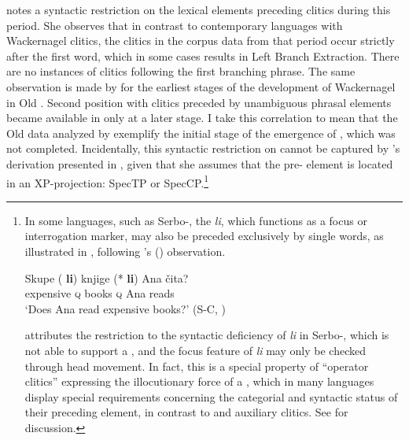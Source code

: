 \documentclass[output=paper,modfonts,newtxmath,hidelinks]{langscibook}
\begin{document}
\citeauthor{pancheva2005} notes a syntactic restriction on the lexical elements preceding  clitics during this period. She observes that in contrast to contemporary  languages with Wackernagel clitics, the clitics in the  corpus data from that period occur strictly after the first word, which in some cases results in Left Branch Extraction. There are no instances of clitics following the first branching phrase. The same observation is made by \citet[Chapter 3]{radanovickocic1988} for the earliest stages of the development of Wackernagel  in Old . Second position  with clitics preceded by unambiguous phrasal elements became available in  only at a later stage. I take this correlation to mean that the Old  data analyzed by \citet{pancheva2005} exemplify the initial stage of the emergence of , which was not completed. Incidentally, this syntactic restriction on  cannot be captured by \citeauthor{pancheva2005}’s derivation presented in , given that she assumes that the pre- element is located in an XP-projection: SpecTP or SpecCP.\footnote{\label{11:fn1}In some  languages, such as Serbo-, the   \textit{li}, which functions as a focus or interrogation marker, may also be preceded exclusively by single words, as illustrated in , following \citeauthor{Boskovic2001}'s (\citeyear[27]{Boskovic2001}) observation.

\ea \label{11:exfni}
\gll Skupe (\hspace{-2pt} \textbf{li}) knjige (*\hspace{-2pt} \textbf{li}) Ana čita?\\
expensive {} \textsc{q} books {} \textsc{q} Ana reads\\
\glt `Does Ana read expensive books?' \hfill(S-C, \citealt[27]{Boskovic2001})
\z

\noindent \citet[31ff.]{Boskovic2001} attributes the restriction to the syntactic deficiency of \textit{li} in Serbo-, which is not able to support a , and the focus feature of \textit{li} may only be checked through head movement. In fact, this is a special property of “operator clitics” expressing the illocutionary force of a , which in many  languages display special requirements concerning the categorial and syntactic status of their preceding element, in contrast to  and auxiliary  clitics. See \citet[Chapter 3]{migdalski2016} for discussion.}
\end{document}
